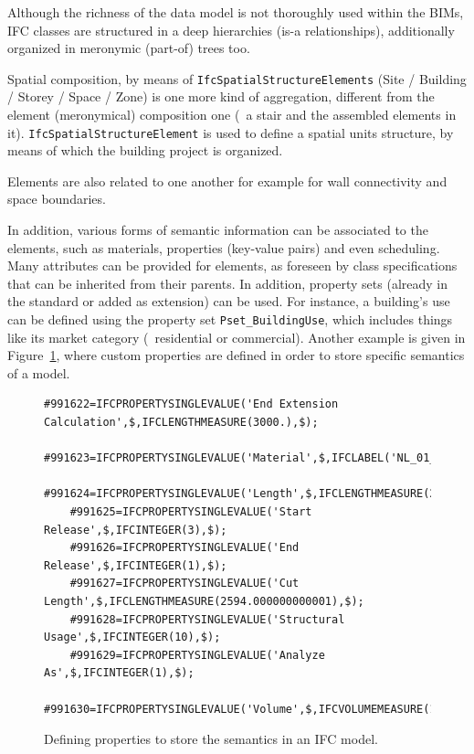 Although the richness of the data model is not thoroughly used within the BIMs,
IFC classes are structured in a deep hierarchies (is-a relationships), additionally organized in
meronymic (part-of) trees too.

Spatial composition, by means of \texttt{IfcSpatialStructureElements} (Site / Building / Storey / Space / Zone) is one more kind of aggregation, different from the element (meronymical) composition one (\eg\ a stair and the assembled elements in it).
\texttt{IfcSpatialStructureElement} is used to define a spatial units structure, by means of which the building project is organized.

Elements are also related to one another for example for wall connectivity and space boundaries.

In addition, various forms of semantic information can be associated to the elements, such as materials, properties (key-value pairs) and even scheduling.
Many attributes can be provided for elements, as foreseen by class specifications that can be inherited from their parents.
In addition, property sets (already in the standard or added as extension) can be used.
For instance, a building's use can be defined using the property set \texttt{Pset\_BuildingUse}, which includes things like its market category (\eg\ residential or commercial).
Another example is given in Figure~\ref{fig:pset}, where custom properties are defined in order to store specific semantics of a model.

\begin{figure}
	\begin{lstlisting}[frame=single]
	#991622=IFCPROPERTYSINGLEVALUE('End Extension Calculation',$,IFCLENGTHMEASURE(3000.),$);
	#991623=IFCPROPERTYSINGLEVALUE('Material',$,IFCLABEL('NL_01_hout_plaat'),$);
	#991624=IFCPROPERTYSINGLEVALUE('Length',$,IFCLENGTHMEASURE(2594.),$);
	#991625=IFCPROPERTYSINGLEVALUE('Start Release',$,IFCINTEGER(3),$);
	#991626=IFCPROPERTYSINGLEVALUE('End Release',$,IFCINTEGER(1),$);
	#991627=IFCPROPERTYSINGLEVALUE('Cut Length',$,IFCLENGTHMEASURE(2594.000000000001),$);
	#991628=IFCPROPERTYSINGLEVALUE('Structural Usage',$,IFCINTEGER(10),$);
	#991629=IFCPROPERTYSINGLEVALUE('Analyze As',$,IFCINTEGER(1),$);
	#991630=IFCPROPERTYSINGLEVALUE('Volume',$,IFCVOLUMEMEASURE(13602936.00000029),$);
\end{lstlisting}
	\caption{Defining properties to store the semantics in an IFC model.}%
	\label{fig:pset}
\end{figure}


